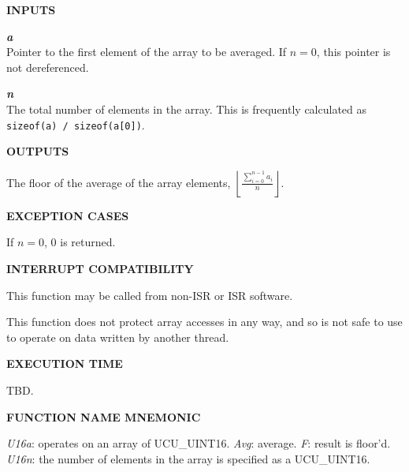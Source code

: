 \noindent\textbf{INPUTS}
\begin{list}{}{\setlength{\leftmargin}{0.5in}\setlength{\itemindent}{-0.25in}\setlength{\topsep}{0.0in}\setlength{\partopsep}{0.0in}}
\item \emph{\textbf{a}}\\
      Pointer to the first element of the array to be averaged.  If $n=0$, 
      this pointer is not dereferenced.
\item \emph{\textbf{n}}\\
      The total number of elements in the array.  This is frequently
      calculated as \texttt{sizeof(a) / sizeof(a[0])}.
\end{list}
\vspace{2.8ex}

\noindent\textbf{OUTPUTS}
\begin{list}{}{\setlength{\leftmargin}{0.25in}\setlength{\topsep}{0.0in}}
\item The floor of the average of the array elements, 
      $\displaystyle{\left\lfloor{\frac{\sum_{i=0}^{n-1}a_i}{n}}\right\rfloor}$.
\end{list}
\vspace{2.8ex}

\noindent\textbf{EXCEPTION CASES}
\begin{list}{}{\setlength{\leftmargin}{0.25in}\setlength{\topsep}{0.0in}}
\item If $n = 0$, 0 is returned.
\end{list}
\vspace{2.8ex}

\noindent\textbf{INTERRUPT COMPATIBILITY}
\begin{list}{}{\setlength{\leftmargin}{0.25in}\setlength{\topsep}{0.0in}}
\item This function may be called from non-ISR or ISR software.
\item This function does not protect array accesses in any way, and so
      is not safe to use to operate on data written by another thread.
\end{list}
\vspace{2.8ex}

\noindent\textbf{EXECUTION TIME}
\begin{list}{}{\setlength{\leftmargin}{0.25in}\setlength{\topsep}{0.0in}}
\item TBD.
\end{list}
\vspace{2.8ex}

\noindent\textbf{FUNCTION NAME MNEMONIC}
\begin{list}{}{\setlength{\leftmargin}{0.25in}\setlength{\topsep}{0.0in}}
\item \emph{U16a}:   operates on an array of UCU\_UINT16.
      \emph{Avg}:    average.
      \emph{F}:      result is floor'd.
      \emph{U16n}:   the number of elements in the array is specified
                     as a UCU\_UINT16.
\end{list}



